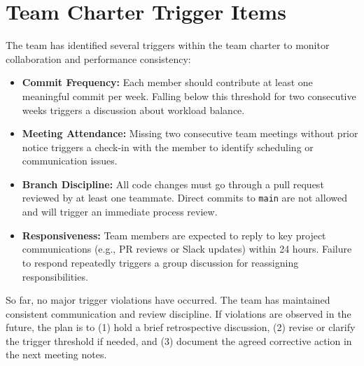 \documentclass{article}
\begin{document}
\section{Team Charter Trigger Items}

The team has identified several triggers within the team charter to monitor collaboration and performance consistency:

\begin{itemize}
    \item \textbf{Commit Frequency:} Each member should contribute at least one meaningful commit per week.
    Falling below this threshold for two consecutive weeks triggers a discussion about workload balance.
    \item \textbf{Meeting Attendance:} Missing two consecutive team meetings without prior notice triggers a check-in with the member to identify scheduling or communication issues.
    \item \textbf{Branch Discipline:} All code changes must go through a pull request reviewed by at least one teammate.
    Direct commits to \texttt{main} are not allowed and will trigger an immediate process review.
    \item \textbf{Responsiveness:} Team members are expected to reply to key project communications (e.g., PR reviews or Slack updates) within 24 hours.
    Failure to respond repeatedly triggers a group discussion for reassigning responsibilities.
\end{itemize}

So far, no major trigger violations have occurred. The team has maintained consistent communication and review discipline.
If violations are observed in the future, the plan is to (1) hold a brief retrospective discussion,
(2) revise or clarify the trigger threshold if needed, and (3) document the agreed corrective action in the next meeting notes.
\end{document}
